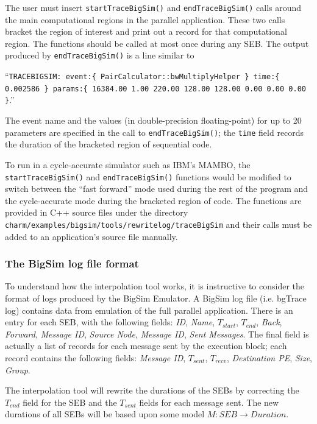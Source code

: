 The user must insert \texttt{startTraceBigSim()} and  \texttt{endTraceBigSim()} calls around the main
computational regions in the parallel application. These two calls bracket the region of interest
and print out a record for that computational region. The functions should be called at most once during
any SEB. The output produced by  \texttt{endTraceBigSim()} is a line similar to

 ``\texttt{TRACEBIGSIM: event:\{ PairCalculator::bwMultiplyHelper \}  time:\{ 0.002586 \}  params:\{ 16384.00 1.00 220.00 128.00 128.00 0.00 0.00 0.00 \}}.'' 

\noindent
The event name and the values (in double-precision floating-point) for up to 20 parameters are
specified in the call to  \texttt{endTraceBigSim()}; the \texttt{time} field records  the duration of the bracketed region of sequential code. 

To run in a cycle-accurate simulator such as IBM's MAMBO, the  \texttt{startTraceBigSim()} and  \texttt{endTraceBigSim()} functions would be modified to switch between the ``fast forward'' mode used during the rest of the
program and the cycle-accurate mode during the bracketed region of code. The functions are provided in C++ source files under the directory \texttt{charm/examples/bigsim/tools/rewritelog/traceBigSim} and their calls
must be added to an application's source file manually.

\subsubsection{The BigSim log file format}

To understand how the interpolation tool works, it is instructive to consider the format
of logs produced by the BigSim Emulator.
A BigSim log file (i.e. bgTrace log) contains data from emulation of the full parallel application.
There is an entry for each SEB, with the following fields:  \textit{ID}, \textit{Name}, $T_{start}$,
$T_{end}$, \textit{Back}, \textit{Forward}, \textit{Message ID}, \textit{Source Node},
\textit{Message ID}, \textit{Sent Messages}. The final field is actually a list of records for each
message sent by the execution block; each record contains the following fields:
 \textit{Message ID}, $T_{sent}$, $T_{recv}$, \textit{Destination PE}, \textit{Size}, \textit{Group}.

The interpolation tool will rewrite the durations of the SEBs by correcting the $T_{end}$ field for the
SEB and the $T_{sent}$ fields for each message sent. The new durations of all SEBs will be based upon
some model $M:SEB\rightarrow Duration$. 

